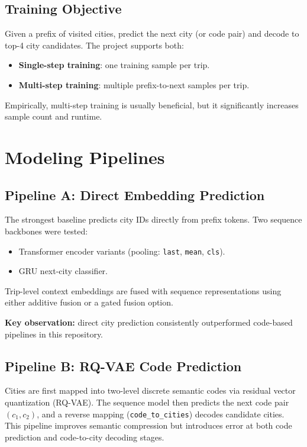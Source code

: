 \documentclass[11pt]{article}
\begin{document}
\subsection{Training Objective}
Given a prefix of visited cities, predict the next city (or code pair) and decode to top-4 city candidates. The project supports both:
\begin{itemize}[leftmargin=1.5em]
    \item \textbf{Single-step training}: one training sample per trip.
    \item \textbf{Multi-step training}: multiple prefix-to-next samples per trip.
\end{itemize}
Empirically, multi-step training is usually beneficial, but it significantly increases sample count and runtime.

\section{Modeling Pipelines}
\subsection{Pipeline A: Direct Embedding Prediction}
The strongest baseline predicts city IDs directly from prefix tokens. Two sequence backbones were tested:
\begin{itemize}[leftmargin=1.5em]
    \item Transformer encoder variants (pooling: \texttt{last}, \texttt{mean}, \texttt{cls}).
    \item GRU next-city classifier.
\end{itemize}
Trip-level context embeddings are fused with sequence representations using either additive fusion or a gated fusion option.

\textbf{Key observation:} direct city prediction consistently outperformed code-based pipelines in this repository.

\subsection{Pipeline B: RQ-VAE Code Prediction}
Cities are first mapped into two-level discrete semantic codes via residual vector quantization (RQ-VAE). The sequence model then predicts the next code pair \((c_1, c_2)\), and a reverse mapping (\texttt{code\_to\_cities}) decodes candidate cities. This pipeline improves semantic compression but introduces error at both code prediction and code-to-city decoding stages.
\end{document}
